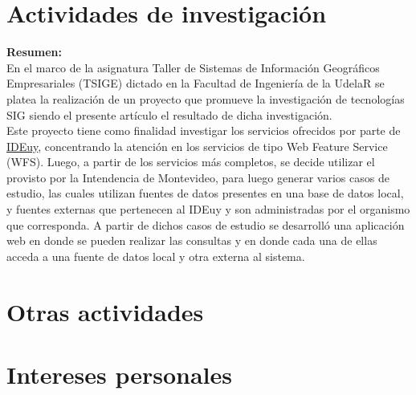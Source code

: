 \documentclass[11pt,a4paper]{moderncv}
\begin{document}
\section{Actividades de investigación}
              {}
              {
               \textbf{Resumen:}\\
               En el marco de la asignatura Taller de Sistemas de Información Geográficos Empresariales (TSIGE)
               dictado en la Facultad de Ingeniería de la UdelaR se platea la realización de un proyecto que
               promueve la investigación de tecnologías SIG siendo el presente artículo el resultado de dicha
               investigación.\\
               Este proyecto tiene como finalidad investigar los servicios ofrecidos por parte de
               \href{http://www.agesic.gub.uy/innovaportal/v/665/1/agesic/IDE.html}{IDEuy},
               concentrando la atención en los servicios de tipo Web Feature Service (WFS).
               Luego, a partir de los servicios más completos, se decide utilizar el provisto por la Intendencia
               de Montevideo, para luego generar varios casos de estudio, las cuales utilizan fuentes de datos
               presentes en una base de datos local, y fuentes externas que pertenecen al IDEuy y son administradas
               por el organismo que corresponda. A partir de dichos casos de estudio se desarrolló una aplicación
               web en donde se pueden realizar las consultas y en donde cada una de ellas acceda a una fuente de
               datos local y otra externa al sistema.
              }


\section{Otras actividades}


\section{Intereses personales}
\end{document}
